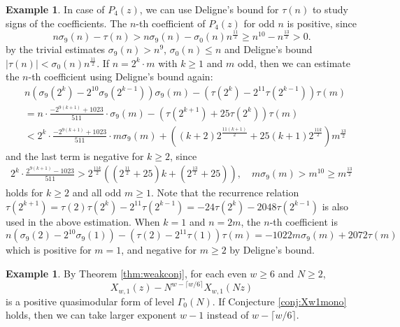 \documentclass[10pt,reqno]{amsproc}
\newcommand{\1}{\mathds{1}}	%
\theoremstyle{definition}
\newtheorem{example}[theorem]{Example}
\theoremstyle{remark}
\begin{document}
\begin{example}
    In case of $P_4(z)$, we can use Deligne's bound for $\tau(n)$ to study signs of the coefficients.
    The $n$-th coefficient of $P_4(z)$ for odd $n$ is positive, since
    \[
    n \sigma_9(n) - \tau(n) > n \sigma_9(n) - \sigma_0(n) n^{\frac{11}{2}} \ge n^{10} - n^{\frac{13}{2}} > 0.
    \]
    by the trivial estimates $\sigma_9(n) > n^9$, $\sigma_0(n) \le n$ and Deligne's bound $|\tau(n)| < \sigma_0(n) n^{\frac{11}{2}}$.
    If $n = 2^k \cdot m$ with $k \ge 1$ and $m$ odd, then we can estimate the $n$-th coefficient using Deligne's bound again:
    \begin{align*}
        &n \left(\sigma_9(2^k) - 2^{10} \sigma_9(2^{k-1})\right) \sigma_9(m) - \left(\tau(2^k) - 2^{11} \tau(2^{k-1})\right) \tau(m) \\
        &= n \cdot \frac{-2^{9(k+1)} + 1023}{511} \cdot \sigma_9(m) - (\tau(2^{k+1}) + 25 \tau(2^{k})) \tau(m) \\
        &< 2^k  \cdot \frac{-2^{9(k+1)} + 1023}{511} \cdot m \sigma_9(m) + ((k+2) 2^{\frac{11(k+1)}{2}} + 25 (k+1) 2^{\frac{11k}{2}}) m^{\frac{13}{2}}
    \end{align*}
    and the last term is negative for $k \ge 2$, since
    \begin{align*}
        2^k \cdot \frac{2^{9(k+1)} - 1023}{511} >  2^{\frac{11k}{2}} ((2^{\frac{11}{2}} + 25)k + (2^{\frac{13}{2}} + 25)), \quad m \sigma_9(m) > m^{10} \ge m^{\frac{13}{2}}
    \end{align*}
    holds for $k \ge 2$ and all odd $m \ge 1$.
    Note that the recurrence relation $\tau(2^{k+1}) = \tau(2)\tau(2^k) - 2^{11} \tau(2^{k-1}) = -24 \tau(2^k) - 2048 \tau(2^{k-1})$ is also used in the above estimation.
    When $k=1$ and $n = 2m$, the $n$-th coefficient is
    \[
    n (\sigma_9(2) - 2^{10} \sigma_9(1)) - (\tau(2) - 2^{11}\tau(1)) \tau(m) = -1022 m \sigma_9(m) + 2072 \tau(m)
    \]
    which is positive for $m = 1$, and negative for $m \ge 2$ by Deligne's bound.
\end{example}

\begin{example}
    By Theorem \ref{thm:weakconj}, for each even $w \ge 6$ and $N \ge 2$,
    \[
    X_{w, 1}(z) - N^{w - \lceil w/6 \rceil} X_{w, 1}(Nz)
    \]
    is a positive quasimodular form of level $\Gamma_0(N)$.
    If Conjecture \ref{conj:Xw1mono} holds, then we can take larger exponent $w - 1$ instead of $w - \lceil w/6 \rceil$.
\end{example}
\end{document}
